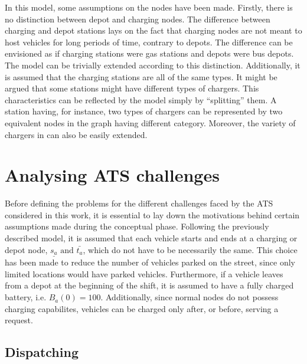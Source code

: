 In this model, some assumptions on the nodes have been made. Firstly, there is no distinction between depot and charging nodes. The difference between charging and depot stations lays on the fact that charging nodes are not meant to host vehicles for long periods of time, contrary to depots. The difference can be envisioned as if charging stations were gas stations and depots were bus depots. The  model can be trivially extended according to this distinction. Additionally, it is assumed that the charging stations are all of the same types. It might be argued that some stations might have different types of chargers. This characteristics can be reflected by the model simply by ``splitting'' them. A station having, for instance, two types of chargers can be represented by two equivalent nodes in the graph having different category. Moreover, the variety of chargers in  can also be easily extended. 


\section{Analysing ATS challenges}\label{sec:ats_challenges_analysis}
Before defining the problems for the different challenges faced by the ATS considered in this work, it is essential to lay down the motivations behind certain assumptions made during the conceptual phase. Following the previously described model, it is assumed that each vehicle starts and ends at a charging or depot node, $\underline{s_a} \text{ and }\bar{t_a}$, which do not have to be necessarily the same. This choice has been made to reduce the number of vehicles parked on the street, since only limited locations would have parked vehicles. Furthermore, if a vehicle leaves from a depot at the beginning of the shift, it is assumed to have a fully charged battery, i.e. $B_a(0) = 100$.  Additionally, since normal nodes do not possess charging capabilites, vehicles can be charged only after, or before, serving a request.



\subsection{Dispatching}

